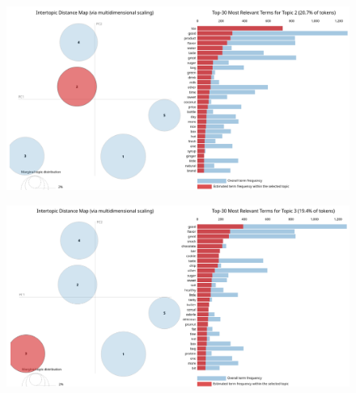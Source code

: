 \documentclass{beamer}
\begin{document}
\begin{frame}
    \begin{figure}
        \includegraphics[width=\textwidth]{../figures/result_tea.png}
    \end{figure}
\end{frame}

\begin{frame}
    \begin{figure}
        \includegraphics[width=\textwidth]{../figures/result_snack.png}
    \end{figure}
\end{frame}
\end{document}
